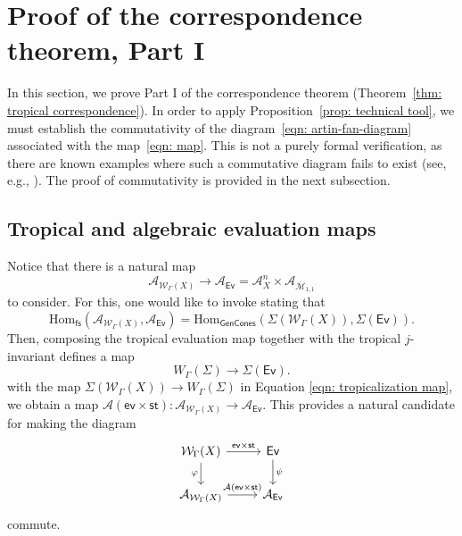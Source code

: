 \documentclass{article}
\def\Ev{{\mathsf{Ev}}}
\def\oM{\overline{\mathcal{M}}}
\def\WG{\mathcal{W}_{\Gamma}}
\begin{document}
\section{Proof of the correspondence theorem, Part I}\label{sec: correspondence theorems}





In this section, we prove Part I of the correspondence theorem (Theorem~\ref{thm: tropical correspondence}). In order to apply Proposition~\ref{prop: technical tool}, we must establish the commutativity of the diagram~\eqref{eqn: artin-fan-diagram} associated with the map~\eqref{eqn: map}. This is not a purely formal verification, as there are known examples where such a commutative diagram fails to exist (see, e.g., \cite[Section~4.6.2]{ACMUW}). The proof of commutativity is provided in the next subsection.

\subsection{ Tropical and algebraic evaluation maps}\label{sec: key commutative diagram}



Notice that there is a natural map
\[
\mathcal{A}_{\WG(X)} \to \mathcal{A}_{\Ev}= \mathcal{A}_X^n \times \mathcal{A}_{\oM_{1,1}}
\]
to consider. For this, one would like to invoke \cite[Proposition~2.10]{ACGSI} stating that
\begin{equation}\label{eqn: ACSI-functoriality-Artin-fans}
\mathrm{Hom}_{\mathsf{fs}}(\mathcal{A}_{\WG(X)}, \mathcal{A}_{\Ev})
=
\mathrm{Hom}_{\mathsf{GenCones}}(\Sigma(\WG(X)), \Sigma(\Ev)).
\end{equation}
Then, composing the tropical evaluation map together with the tropical $j$-invariant defines a map
\[
W_{\Gamma}(\Sigma) \to \Sigma(\Ev).
\]
with the map $\Sigma(\WG(X)) \to W_{\Gamma}(\Sigma)$ in Equation \eqref{eqn: tropicalization map}, we obtain a map $\mathcal{A}(\mathsf{ev} \times \mathsf{st}): \mathcal{A}_{\WG(X)} \to \mathcal{A}_{\Ev}$. This provides a natural candidate for making the diagram
\begin{equation}\label{eqn: our artin-fan-diagram}
\begin{tikzcd}
\WG(X) 
\arrow[r, "\mathsf{ev} \times \mathsf{st}"] 
\arrow[d, "\varphi"']               
& \Ev
\arrow[d, "\psi"]     \\
\mathcal{A}_{\WG(X)} 
\arrow[r, "\mathcal{A}(\mathsf{ev} \times \mathsf{st})"] 
& \mathcal{A}_{\Ev}
\end{tikzcd}
\end{equation}
commute.
\end{document}
